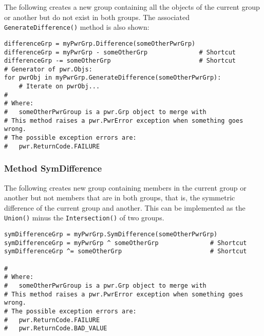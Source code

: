 The following creates a new group containing all the objects of the current
group or another but do not exist in both groups. The associated
\texttt{GenerateDifference()} method is also shown:

\begin{center}\begin{minipage}{.95\linewidth}\begin{lstlisting}
differenceGrp = myPwrGrp.Difference(someOtherPwrGrp)
differenceGrp = myPwrGrp - someOtherGrp              # Shortcut
differenceGrp -= someOtherGrp                        # Shortcut
# Generator of pwr.Objs:
for pwrObj in myPwrGrp.GenerateDifference(someOtherPwrGrp):
    # Iterate on pwrObj...
#
# Where:
#   someOtherPwrGroup is a pwr.Grp object to merge with
# This method raises a pwr.PwrError exception when something goes wrong.
# The possible exception errors are:
#   pwr.ReturnCode.FAILURE
\end{lstlisting}\end{minipage}\end{center}


\subsubsection{Method SymDifference} \label{meth:SymDifference}

The following creates new group containing members in the current group or
another but not members that are in both groups, that is, the symmetric
difference of the current group and another. This can be implemented as the
\texttt{Union()} minus the \texttt{Intersection()} of two groups.

\begin{center}\begin{minipage}{.95\linewidth}\begin{lstlisting}
symDifferenceGrp = myPwrGrp.SymDifference(someOtherPwrGrp)
symDifferenceGrp = myPwrGrp ^ someOtherGrp              # Shortcut
symDifferenceGrp ^= someOtherGrp                        # Shortcut

#
# Where:
#   someOtherPwrGroup is a pwr.Grp object to merge with
# This method raises a pwr.PwrError exception when something goes wrong.
# The possible exception errors are:
#   pwr.ReturnCode.FAILURE
#   pwr.ReturnCode.BAD_VALUE
\end{lstlisting}\end{minipage}\end{center}

